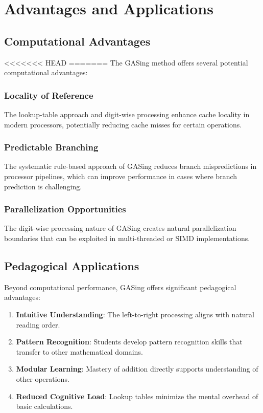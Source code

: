 \section{Advantages and Applications}\label{sec:discussion}

\subsection{Computational Advantages}

<<<<<<< HEAD
=======
The GASing method offers several potential computational advantages:

\subsubsection{Locality of Reference}
The lookup-table approach and digit-wise processing enhance cache locality in modern processors, potentially reducing cache misses for certain operations.

\subsubsection{Predictable Branching}
The systematic rule-based approach of GASing reduces branch mispredictions in processor pipelines, which can improve performance in cases where branch prediction is challenging.

\subsubsection{Parallelization Opportunities}
The digit-wise processing nature of GASing creates natural parallelization boundaries that can be exploited in multi-threaded or SIMD implementations.

\subsection{Pedagogical Applications}

Beyond computational performance, GASing offers significant pedagogical advantages:

\begin{enumerate}
    \item \textbf{Intuitive Understanding}: The left-to-right processing aligns with natural reading order.
    \item \textbf{Pattern Recognition}: Students develop pattern recognition skills that transfer to other mathematical domains.
    \item \textbf{Modular Learning}: Mastery of addition directly supports understanding of other operations.
    \item \textbf{Reduced Cognitive Load}: Lookup tables minimize the mental overhead of basic calculations.
\end{enumerate}

